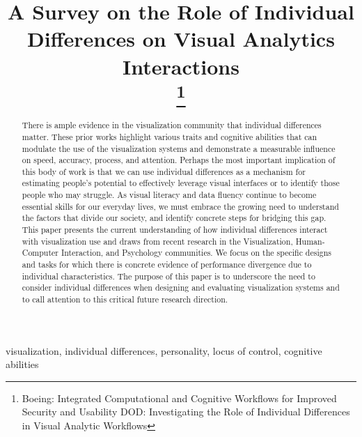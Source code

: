 \documentclass[conference]{IEEEtran}
\begin{document}
\title{A Survey on the Role of Individual Differences on Visual
Analytics Interactions\\
\thanks{
    Boeing: Integrated Computational and Cognitive Workflows for
Improved Security and Usability \newline
DOD: Investigating the Role of Individual Differences in Visual Analytic Workflows
}
}

\author{
\and
{}

}

\maketitle

\begin{abstract}
There is ample evidence in the visualization community that individual differences
matter. These prior works highlight various traits and cognitive abilities that
can modulate the use of the visualization systems and demonstrate a measurable
influence on speed, accuracy, process, and attention. Perhaps the most
important implication of this body of work is that we can use individual differences
as a mechanism for estimating people’s potential to effectively leverage visual
interfaces or to identify those people who may struggle. As visual literacy and
data fluency continue to become essential skills for our everyday lives, we
must embrace the growing need to understand the factors that divide our
society, and identify concrete steps for bridging this gap. This paper presents
the current understanding of how individual differences interact with
visualization use and draws from recent research in the Visualization,
Human-Computer Interaction, and Psychology communities. We focus on the
specific designs and tasks for which there is concrete evidence of performance
divergence due to individual characteristics. The purpose of this paper is to
underscore the need to consider individual differences when designing and
evaluating visualization systems and to call attention to this critical future
research direction.
\end{abstract}

\begin{IEEEkeywords}
visualization, individual differences, personality,
locus of control, cognitive abilities
\end{IEEEkeywords}
\end{document}
